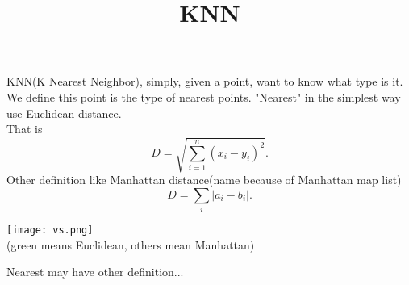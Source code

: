 \documentclass[12pt]{article}
\title{KNN}
\theoremstyle{definition}
\begin{document}
KNN(K Nearest Neighbor), simply, given a point, want to know what type is it. We define this point is the type of nearest points. "Nearest" in the simplest way use Euclidean distance.\\
That is
\[
	D = \sqrt{\sum_{i=1}^{n}(x_{i}-y_{i})^{2}}
.\] 
Other definition like Manhattan distance(name because of Manhattan map list)
\[
	D = \sum_{i}|a_{i} - b_{i}|
.\] 
\begin{center}
\texttt{[image: vs.png]} \\
(green means Euclidean, others mean Manhattan)
\end{center}
Nearest may have other definition...
\end{document}
